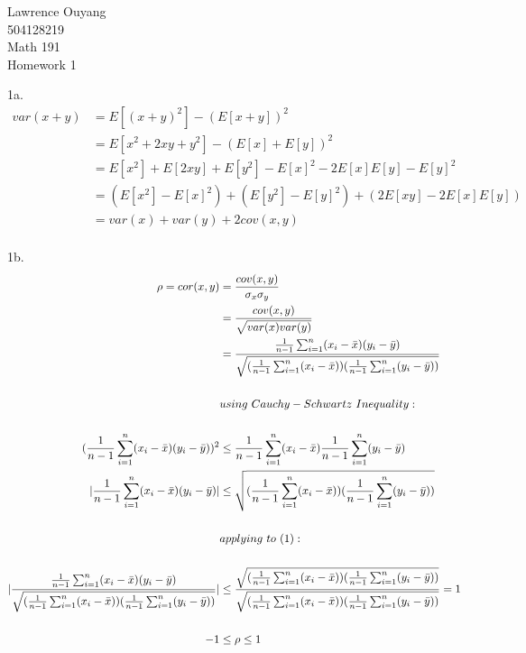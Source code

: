 \documentclass[12pt]{article}
\begin{document}
\begin{flushright}
Lawrence Ouyang\\
504128219\\
Math 191\\
Homework 1\\
\end{flushright}

1a.
\begin{align} \nonumber
var(x+y) &= E[(x+y)^2] - (E[x+y])^2\\ \nonumber
&= E[x^2+2xy+y^2] - (E[x]+E[y])^2\\ \nonumber
&= E[x^2] + E[2xy] + E[y^2] - E[x]^2 - 2E[x]E[y] - E[y]^2\\ \nonumber
&= (E[x^2] - E[x]^2) + (E[y^2] - E[y]^2) + (2E[xy] - 2E[x]E[y])\\ \nonumber
&= var(x) + var(y) + 2cov(x,y)\\ \nonumber
\end{align}

1b.
\begin{align} \nonumber
\rho = cor(x,y) &= \frac{cov(x,y)}{\sigma_x\sigma_y}\\ \nonumber
&= \frac{cov(x,y)}{\sqrt{var(x)var(y)}}\\
&= \frac{\frac{1}{n-1} \sum_{i=1}^{n} ( x_i - \bar{x})( y_i - \bar{y})}{\sqrt{(\frac{1}{n-1} \sum_{i=1}^{n} ( x_i - \bar{x}))(\frac{1}{n-1} \sum_{i=1}^{n} ( y_i - \bar{y}))}}\\ \nonumber
\\\nonumber &using \-\ Cauchy-Schwartz \-\ Inequality:\\ \nonumber \\ \nonumber
(\frac{1}{n-1} \sum_{i=1}^{n} ( x_i - \bar{x})( y_i - \bar{y}))^2 &\leq \frac{1}{n-1} \sum_{i=1}^{n} ( x_i - \bar{x})\frac{1}{n-1} \sum_{i=1}^{n} ( y_i - \bar{y})\\ \nonumber
|\frac{1}{n-1} \sum_{i=1}^{n} ( x_i - \bar{x})( y_i - \bar{y})| &\leq \sqrt{(\frac{1}{n-1} \sum_{i=1}^{n} ( x_i - \bar{x}))(\frac{1}{n-1} \sum_{i=1}^{n} ( y_i - \bar{y}))} \\ \nonumber
\\\nonumber &applying \-\ to \-\ (1):\\ \nonumber \\ \nonumber
|\frac{\frac{1}{n-1} \sum_{i=1}^{n} ( x_i - \bar{x})( y_i - \bar{y})}{\sqrt{(\frac{1}{n-1} \sum_{i=1}^{n} ( x_i - \bar{x}))(\frac{1}{n-1} \sum_{i=1}^{n} ( y_i - \bar{y}))}}| &\leq \frac{\sqrt{(\frac{1}{n-1} \sum_{i=1}^{n} ( x_i - \bar{x}))(\frac{1}{n-1} \sum_{i=1}^{n} ( y_i - \bar{y}))}}{\sqrt{(\frac{1}{n-1} \sum_{i=1}^{n} ( x_i - \bar{x}))(\frac{1}{n-1} \sum_{i=1}^{n} ( y_i - \bar{y}))}} = 1\\ \nonumber \\ \nonumber
-1 &\leq \rho \leq 1
\end{align}
\end{document}
